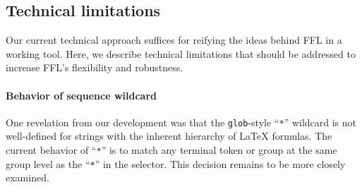 \subsection{Technical limitations}\label{tech-limitations}

Our current technical approach suffices for reifying the ideas behind FFL in a working tool. Here, we describe technical limitations that should be addressed to increase FFL's flexibility and robustness.




\paragraph{Behavior of sequence wildcard} One revelation from our development was that the \texttt{glob}-style ``\texttt{*}'' wildcard is not well-defined for strings with the inherent hierarchy of LaTeX formulas. The current behavior of ``\texttt{*}'' is to match any terminal token or group at the same group level as the ``\texttt{*}'' in the selector. This decision remains to be more closely examined. %


